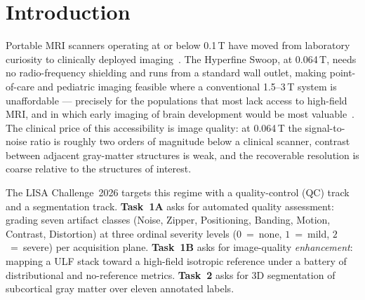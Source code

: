 \documentclass[runningheads]{llncs}
\begin{document}
\FloatBarrier
\section{Introduction}
\label{sec:intro}

Portable MRI scanners operating at or below 0.1\,T have moved from laboratory
curiosity to clinically deployed imaging~\cite{marques2019low,sheth2021portable}.
The Hyperfine Swoop, at 0.064\,T, needs no radio-frequency shielding and runs
from a standard wall outlet, making point-of-care and pediatric imaging feasible
where a conventional 1.5--3\,T system is unaffordable --- precisely for the
populations that most lack access to high-field MRI, and in which early imaging of
brain development would be most valuable~\cite{arnold2023low,sarracanie2020}.
The clinical price of this accessibility is image quality: at 0.064\,T the
signal-to-noise ratio is roughly two orders of magnitude below a clinical
scanner, contrast between adjacent gray-matter structures is weak, and the
recoverable resolution is coarse relative to the structures of interest.

The LISA Challenge~2026 targets this regime with a quality-control (QC) track and
a segmentation track. \textbf{Task~1A} asks for automated quality assessment:
grading seven artifact classes (Noise, Zipper, Positioning, Banding, Motion,
Contrast, Distortion) at three ordinal severity levels ($0$~=~none, $1$~=~mild,
$2$~=~severe) per acquisition plane. \textbf{Task~1B} asks for image-quality
\emph{enhancement}: mapping a ULF stack toward a high-field isotropic reference
under a battery of distributional and no-reference metrics. \textbf{Task~2} asks
for 3D segmentation of subcortical gray matter over eleven annotated labels.
\end{document}
